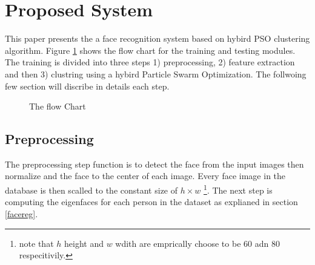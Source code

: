\documentclass[a4paper,twoside]{article}
\begin{document}
\section{Proposed System}
\label{sec:proposed}

This paper presents the a face recognition system based on hybird PSO clustering algorithm. Figure \ref{Blockchart} shows the flow chart for the training and testing modules. The training is divided into three steps 1) preprocessing, 2) feature extraction and then 3) clustring using a hybird Particle Swarm Optimization. The follwoing few section will discribe in details each step.  
  
\begin{figure}
 \begin{center}
 \centering

\caption{ The flow Chart}
\label{Blockchart}
 \end{center}\end{figure}
\subsection{Preprocessing}
The preprocessing step function is to detect the face from the input images then normalize and the face to the center of each  image.  Every face image in the database is  then scalled to the constant size of $h \times w$ \footnote{ note that  $h$ height and $w$ wdith are emprically choose to be 60 adn 80 respecitivily.}. The next step is computing the eigenfaces for each person in the dataset as explianed in section \ref{facereg}.
\end{document}
